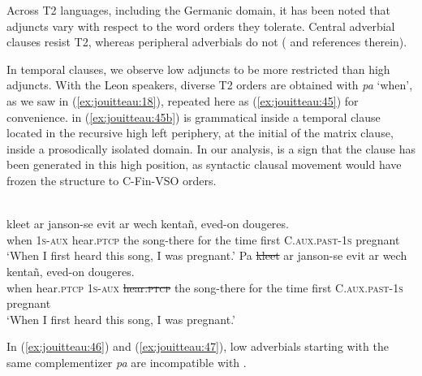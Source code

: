\documentclass[output=paper,colorlinks,citecolor=brown]{langscibook}
\begin{document}

Across T2 languages, including the Germanic domain, it has been noted that adjuncts vary with respect to the word orders they tolerate. Central adverbial clauses resist T2, whereas peripheral adverbials do not (\citealt{mj:Haegeman2012} and references therein). 


In temporal clauses, we observe low adjuncts to be more restricted than high adjuncts. With the Leon speakers, diverse T2 orders are obtained with \textit{pa} ‘when’, as we saw in (\ref{ex:jouitteau:18}), repeated here as (\ref{ex:jouitteau:45}) for convenience.  in (\ref{ex:jouitteau:45b}) is grammatical inside a temporal clause located in the recursive high left periphery, at the initial of the matrix clause, inside a prosodically isolated domain.  In our analysis,  is a sign that the clause has been generated in this high position, as syntactic clausal movement would have frozen the structure to C-Fin-VSO orders. 

\ea \label{ex:jouitteau:45} \\
\ea \label{ex:jouitteau:45a}
\gll {}       {}    kleet         ar janson-se     evit  ar  wech kentañ, eved-on         dougeres. \\
when  1\textsc{s{}-aux} hear\textsc{.ptcp}  the song-there  for   the time  first      C.\textsc{aux.past}{}-\textsc{1s} pregnant \\
\glt `When I first heard this song, I was pregnant.’
\ex \label{ex:jouitteau:45b}
\gll Pa  {} \sout{kleet} ar janson-se    evit ar wech kentañ, eved-on    dougeres.  \\
when hear\textsc{.ptcp} 1\textsc{s-aux} \sout{hear\textsc{.ptcp}} the song-there  for the time  first     C.\textsc{aux.past}{}-\textsc{1s} pregnant \\ 
\glt `When I first heard this song, I was pregnant.’ \\
\z 
\z 


In (\ref{ex:jouitteau:46}) and (\ref{ex:jouitteau:47}), low adverbials starting with the same complementizer \textit{pa} are incompatible with .
\end{document}

